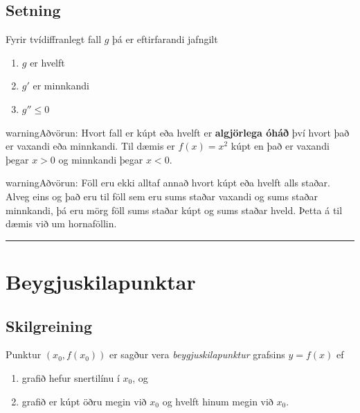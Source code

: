 \documentclass[b5paper,10pt,icelandic]{sphinxmanual}
\begin{document}
\subsection{Setning}
\label{kafli05:index-1}\label{kafli05:id3}
Fyrir tvídiffranlegt fall \(g\) þá er eftirfarandi jafngilt
\begin{enumerate}
\item {} 
\(g\) er hvelft

\item {} 
\(g'\) er minnkandi

\item {} 
\(g'' \leq 0\)

\end{enumerate}

\begin{notice}{warning}{Aðvörun:}
Hvort fall er kúpt eða hvelft er \textbf{algjörlega óháð} því hvort það er
vaxandi eða minnkandi. Til dæmis er \(f(x) = x^2\) kúpt en það er
vaxandi þegar \(x>0\) og minnkandi þegar \(x<0\).
\end{notice}

\begin{notice}{warning}{Aðvörun:}
Föll eru ekki alltaf annað hvort kúpt eða hvelft alls staðar. Alveg
eins og það eru til föll sem eru sums staðar vaxandi og sums staðar
minnkandi, þá eru mörg föll sums staðar kúpt og sums staðar hveld.
Þetta á til dæmis við um hornaföllin.
\end{notice}


\bigskip\hrule{}\bigskip



\section{Beygjuskilapunktar}
\label{kafli05:beygjuskilapunktar}

\subsection{Skilgreining}
\label{kafli05:skilgreining}\label{kafli05:index-2}
Punktur \((x_0, f(x_0))\) er sagður vera \textit{beygjuskilapunktur}
grafsins \(y=f(x)\) ef
\begin{enumerate}
\item {} 
grafið hefur snertilínu í \(x_0\), og

\item {} 
grafið er kúpt öðru megin við \(x_0\) og hvelft hinum megin við
\(x_0\).

\end{enumerate}
\end{document}
